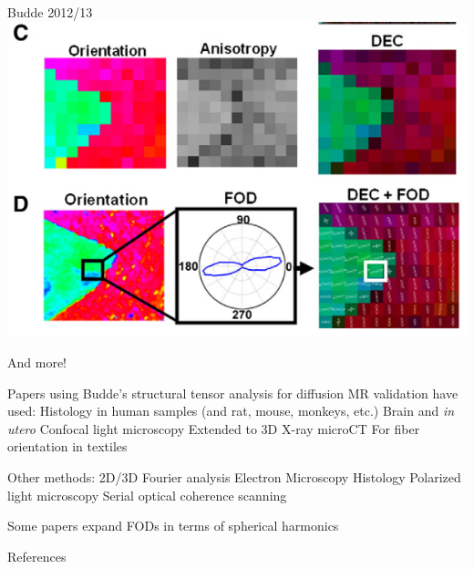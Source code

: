 \documentclass[presentation, 10pt]{beamer}
\begin{document}
  \begin{frame}{Budde 2012/13 \cite{budde2012, budde2013}}
    \centering
    \includegraphics[height=0.9\textheight]{figs/budde_method_2}
  \end{frame}
      

  \begin{frame}{And more!}
    \begin{outline}
      \1 Papers using Budde's structural tensor analysis for diffusion MR validation have used:\newline
      \2 Histology in human samples (and rat, mouse, monkeys, etc.)
      \3 Brain and \textit{in utero}
      \2 Confocal light microscopy
      \3 Extended to 3D
      \2 X-ray microCT
      \3 For fiber orientation in textiles

      \1 Other methods:
      \2 2D/3D Fourier analysis
      \3 Electron Microscopy
      \3 Histology
      \2 Polarized light microscopy
      \2 Serial optical coherence scanning

      \1 Some papers expand FODs in terms of spherical harmonics
    \end{outline}
  \end{frame}

\begin{frame}{References}
  
  
\end{frame}
\end{document}
